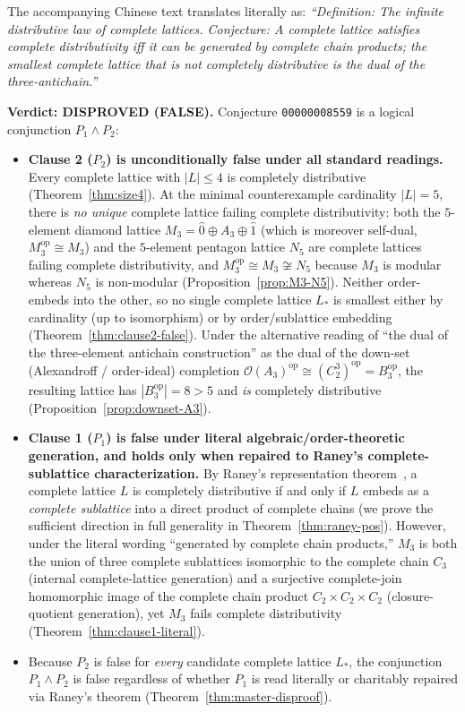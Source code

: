 \documentclass[11pt,a4paper]{article}
\theoremstyle{plain}
\theoremstyle{definition}
\newcommand{\op}{\mathrm{op}}
\newcommand{\Down}{\mathcal{O}}
\begin{document}
The accompanying Chinese text translates literally as: \emph{``Definition: The infinite
distributive law of complete lattices. Conjecture: A complete lattice satisfies complete
distributivity iff it can be generated by complete chain products; the smallest complete
lattice that is not completely distributive is the dual of the three-antichain.''}

\medskip
\noindent\textbf{Verdict: DISPROVED (FALSE).}
Conjecture \texttt{00000008559} is a logical conjunction $P_1 \wedge P_2$:
\begin{itemize}
  \item \textbf{Clause 2 ($P_2$) is unconditionally false under all standard readings.}
    Every complete lattice with $|L| \le 4$ is completely distributive
    (Theorem~\ref{thm:size4}). At the minimal counterexample cardinality $|L| = 5$,
    there is \emph{no unique} complete lattice failing complete distributivity: both the
    $5$-element diamond lattice $M_3 = \hat{0} \oplus A_3 \oplus \hat{1}$ (which is
    moreover self-dual, $M_3^{\op} \cong M_3$) and the $5$-element pentagon lattice $N_5$
    are complete lattices failing complete distributivity, and $M_3^{\op} \cong M_3 \not\cong N_5$
    because $M_3$ is modular whereas $N_5$ is non-modular (Proposition~\ref{prop:M3-N5}).
    Neither order-embeds into the other, so no single complete lattice $L_*$ is smallest
    either by cardinality (up to isomorphism) or by order/sublattice embedding
    (Theorem~\ref{thm:clause2-false}). Under the alternative reading of ``the dual of the
    three-element antichain construction'' as the dual of the down-set (Alexandroff /
    order-ideal) completion $\Down(A_3)^{\op} \cong (C_2^3)^{\op} = B_3^{\op}$, the
    resulting lattice has $|B_3^{\op}| = 8 > 5$ and \emph{is} completely distributive
    (Proposition~\ref{prop:downset-A3}).
  \item \textbf{Clause 1 ($P_1$) is false under literal algebraic/order-theoretic
    generation, and holds only when repaired to Raney's complete-sublattice
    characterization.} By Raney's representation theorem~\cite{Raney1953}, a complete
    lattice $L$ is completely distributive if and only if $L$ embeds as a \emph{complete
    sublattice} into a direct product of complete chains (we prove the sufficient
    direction in full generality in Theorem~\ref{thm:raney-pos}). However, under the
    literal wording ``generated by complete chain products,'' $M_3$ is both the union of
    three complete sublattices isomorphic to the complete chain $C_3$ (internal
    complete-lattice generation) and a surjective complete-join homomorphic image of the
    complete chain product $C_2 \times C_2 \times C_2$ (closure-quotient generation), yet
    $M_3$ fails complete distributivity (Theorem~\ref{thm:clause1-literal}).
  \item Because $P_2$ is false for \emph{every} candidate complete lattice $L_*$, the
    conjunction $P_1 \wedge P_2$ is false regardless of whether $P_1$ is read literally
    or charitably repaired via Raney's theorem (Theorem~\ref{thm:master-disproof}).
\end{itemize}
\end{document}
